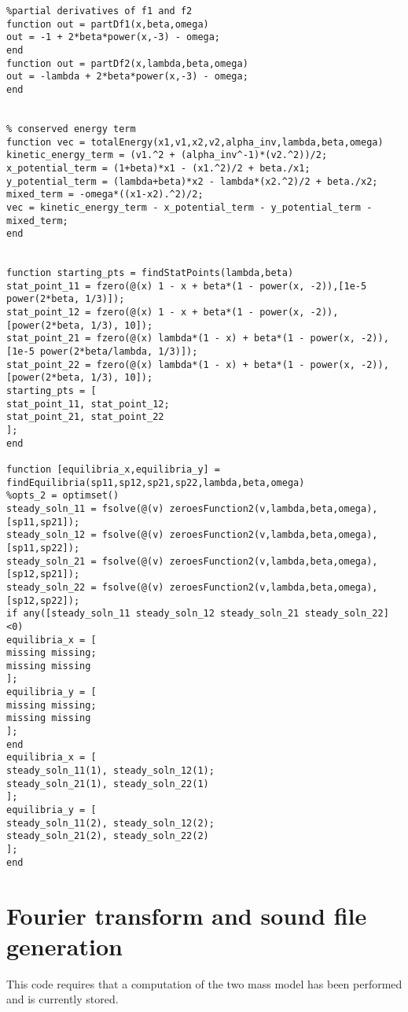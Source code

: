 \documentclass{report}
\begin{document}
\begin{verbatim}
%partial derivatives of f1 and f2
function out = partDf1(x,beta,omega)
out = -1 + 2*beta*power(x,-3) - omega;
end
function out = partDf2(x,lambda,beta,omega)
out = -lambda + 2*beta*power(x,-3) - omega;
end


% conserved energy term
function vec = totalEnergy(x1,v1,x2,v2,alpha_inv,lambda,beta,omega)
kinetic_energy_term = (v1.^2 + (alpha_inv^-1)*(v2.^2))/2;
x_potential_term = (1+beta)*x1 - (x1.^2)/2 + beta./x1;
y_potential_term = (lambda+beta)*x2 - lambda*(x2.^2)/2 + beta./x2;
mixed_term = -omega*((x1-x2).^2)/2;
vec = kinetic_energy_term - x_potential_term - y_potential_term - mixed_term;
end


function starting_pts = findStatPoints(lambda,beta)
stat_point_11 = fzero(@(x) 1 - x + beta*(1 - power(x, -2)),[1e-5 power(2*beta, 1/3)]);
stat_point_12 = fzero(@(x) 1 - x + beta*(1 - power(x, -2)),[power(2*beta, 1/3), 10]);
stat_point_21 = fzero(@(x) lambda*(1 - x) + beta*(1 - power(x, -2)),[1e-5 power(2*beta/lambda, 1/3)]); 
stat_point_22 = fzero(@(x) lambda*(1 - x) + beta*(1 - power(x, -2)),[power(2*beta, 1/3), 10]);
starting_pts = [
stat_point_11, stat_point_12;
stat_point_21, stat_point_22
];
end

function [equilibria_x,equilibria_y] = findEquilibria(sp11,sp12,sp21,sp22,lambda,beta,omega)
%opts_2 = optimset()
steady_soln_11 = fsolve(@(v) zeroesFunction2(v,lambda,beta,omega),[sp11,sp21]);
steady_soln_12 = fsolve(@(v) zeroesFunction2(v,lambda,beta,omega),[sp11,sp22]);
steady_soln_21 = fsolve(@(v) zeroesFunction2(v,lambda,beta,omega),[sp12,sp21]);
steady_soln_22 = fsolve(@(v) zeroesFunction2(v,lambda,beta,omega),[sp12,sp22]);
if any([steady_soln_11 steady_soln_12 steady_soln_21 steady_soln_22]<0)
equilibria_x = [
missing missing;
missing missing
];
equilibria_y = [
missing missing;
missing missing
];
end
equilibria_x = [
steady_soln_11(1), steady_soln_12(1);
steady_soln_21(1), steady_soln_22(1)
];
equilibria_y = [
steady_soln_11(2), steady_soln_12(2);
steady_soln_21(2), steady_soln_22(2)
];
end
\end{verbatim}

\section{Fourier transform and sound file generation}

This code requires that a computation of the two mass model has been performed and is currently stored.
\end{document}
